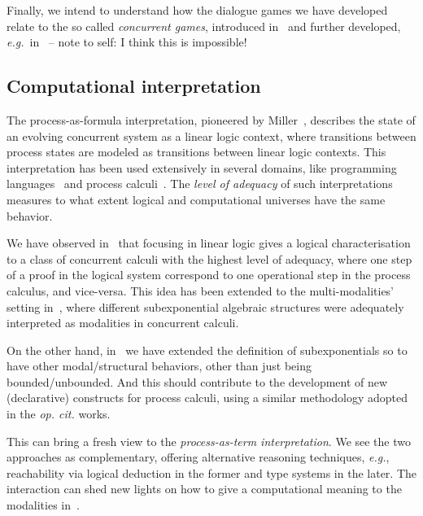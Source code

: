 \documentclass[11pt,a4paper]{article}
\newcommand\eg{\hbox{\textit{e.g.}}}
\begin{document}
Finally, we intend to understand how the dialogue games we have developed relate to the so called {\em concurrent games}, introduced  in~\cite{DBLP:conf/lics/AbramskyM99} and further developed, \eg\  in~\cite{DBLP:conf/lics/FaggianM05,DBLP:journals/lmcs/CastellanCRW17} -- note to self: I think this is impossible!


\subsection{Computational interpretation} 
The process-as-formula interpretation, pioneered by Miller~\cite{DBLP:conf/elp/Miller92}, describes the state of an evolving concurrent system as a linear logic context, where  transitions between process states are modeled as transitions between linear logic contexts. This interpretation has been used extensively in several domains, like programming languages~\cite{DBLP:journals/iandc/CervesatoS09} and process calculi~\cite{DBLP:journals/iandc/FagesRS01}.
The {\em level of adequacy} of such interpretations measures to what extent logical and computational universes have the same behavior. 

We have observed in~\cite{DBLP:journals/entcs/OlarteP15,DBLP:journals/tcs/OlarteP17} that focusing in linear logic  gives a logical characterisation to a class of concurrent calculi with the highest level of adequacy, where one step of a proof in the logical system correspond to one operational step in the process calculus, and vice-versa. This idea has been extended to the multi-modalities' setting in~\cite{DBLP:conf/concur/NigamOP13,DBLP:journals/entcs/OlarteNP14,DBLP:journals/tplp/PimentelON14,DBLP:journals/tcs/OlartePN15,DBLP:journals/tcs/NigamOP17}, where different subexponential algebraic structures were adequately interpreted as modalities in concurrent calculi. 

On the other hand, in~\cite{DBLP:conf/lpar/LellmannOP17} we have extended the definition of subexponentials so to have other modal/structural behaviors, other than just being bounded/unbounded. And this should contribute to the development of new (declarative) constructs for process calculi, using a similar methodology adopted in the {\em op. cit.} works.


This  can bring a fresh view to the {\em process-as-term interpretation}. We see the two approaches as complementary, offering alternative reasoning techniques, \eg, reachability via logical deduction in the former and type systems in the later. The interaction can shed new lights on how to give a computational meaning to the modalities in~\cite{DBLP:conf/lpar/LellmannOP17}.
\end{document}
